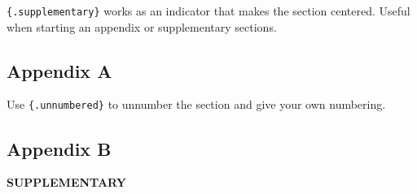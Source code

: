 \documentclass[
  11pt]{article}
\begin{document}
\texttt{\{.supplementary\}} works as an indicator that makes the section
centered. Useful when starting an appendix or supplementary sections.

\subsection*{Appendix A}\label{appendix-a}

Use \texttt{\{.unnumbered\}} to unnumber the section and give your own
numbering.

\subsection*{Appendix B}\label{appendix-b}

\label{supplementary}
\bigskip

\begin{center}

{\large\bf SUPPLEMENTARY}

\end{center}
\end{document}
